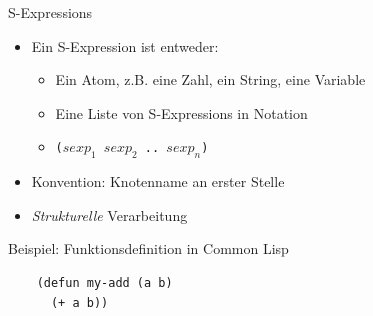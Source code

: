 \documentclass{beamer}
\begin{document}
\begin{frame}[fragile]{S-Expressions}
  \begin{itemize}
  \item Ein S-Expression ist entweder:
    \begin{itemize}
    \item Ein Atom, z.B. eine Zahl, ein String, eine Variable
    \item Eine Liste von S-Expressions in Notation 
    \item[] \texttt{($sexp_1$ $sexp_2$ .. $sexp_n$)}
    \end{itemize}
  \item Konvention: Knotenname an erster Stelle
  \item \textit{Strukturelle} Verarbeitung
  \end{itemize}
  \begin{block}{Beispiel: Funktionsdefinition in Common Lisp}
\begin{verbatim}
    (defun my-add (a b)
      (+ a b))
\end{verbatim}
  \end{block}
\end{frame}
\end{document}
